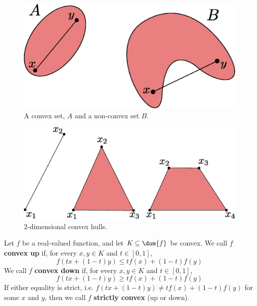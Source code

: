 \begin{figure}[h]
    \centering
    \includegraphics[scale=0.5]{Figures/Chapter1/convex.eps}
    \caption{A convex set, $A$ and a non-convex set  $B$.}
    \label{fig_1.1}
\end{figure}

\begin{figure}[h]
    \centering
    \includegraphics[scale=0.5]{Figures/Chapter1/convex_hulls.eps}
    \caption{$2$-dimensional convex hulls.}
    \label{fig_1.2}
\end{figure}

\begin{definition}
    Let $f$ be a real-valued function, and let  $K \subseteq \dom{f}$ be convex.
    We call $f$  \textbf{convex up} if, for every $x,y \in K$ and $t \in [0,1]$,
    \begin{equation}
        f(tx+(1-t)y) \leq tf(x)+(1-t)f(y)
    \end{equation}
    We call $f$  \textbf{convex down} if, for every $x,y \in K$ and $t \in
    [0,1]$,
    \begin{equation}
        f(tx+(1-t)y) \geq tf(x)+(1-t)f(y)
    \end{equation}
    If either equality is strict, i.e. $f(tx+(1-t)y) \neq tf(x)+(1-t)f(y)$ for
    some $x$ and  $y$, then we call  $f$  \textbf{strictly convex} (up or down).
\end{definition}


